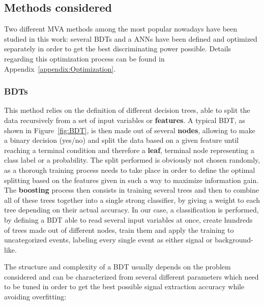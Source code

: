 \documentclass[a4paper, 10pt, openright]{report}
\begin{document}
\subsection{Methods considered}

Two different \ac{MVA} methods among the most popular nowadays have been studied in this work: several \acfp{BDT} and a \acfp{ANN} have been defined and optimized separately in order to get the best discriminating power possible. Details regarding this optimization process can be found in Appendix~\ref{appendix:Optimization}.

\subsubsection{\acfp{BDT}}\label{section:BDT}

This method relies on the definition of different decision trees, able to split the data recursively from a set of input variables or \textbf{features}. A typical \ac{BDT}, as shown in Figure~\ref{fig:BDT}, is then made out of several \textbf{nodes}, allowing to make a binary decision (yes/no) and split the data based on a given feature until reaching a terminal condition and therefore a \textbf{leaf}, terminal node representing a class label or a probability. The split performed is obviously not chosen randomly, as a thorough training process needs to take place in order to define the optimal splitting based on the features given in such a way to maximize information gain. The \textbf{boosting} process then consists in training several trees and then to combine all of these trees together into a single strong classifier, by giving a weight to each tree depending on their actual accuracy. In our case, a classification is performed, by defining a \ac{BDT} able to read several input variables at once, create hundreds of trees made out of different nodes, train them and apply the training to uncategorized events, labeling every single event as either signal or background-like.

The structure and complexity of a \ac{BDT} usually depends on the problem considered and can be characterized from several different parameters which need to be tuned in order to get the best possible signal extraction accuracy while avoiding overfitting:
\end{document}
